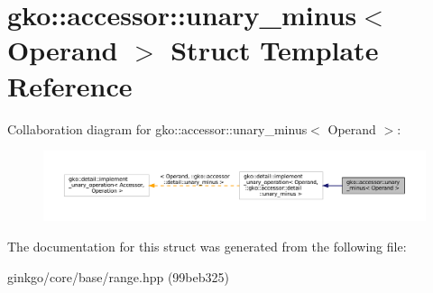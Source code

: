 \hypertarget{structgko_1_1accessor_1_1unary__minus}{}\section{gko\+:\+:accessor\+:\+:unary\+\_\+minus$<$ Operand $>$ Struct Template Reference}
\label{structgko_1_1accessor_1_1unary__minus}


Collaboration diagram for gko\+:\+:accessor\+:\+:unary\+\_\+minus$<$ Operand $>$\+:
\nopagebreak
\begin{figure}[H]
\begin{center}
\leavevmode
\includegraphics[width=350pt]{structgko_1_1accessor_1_1unary__minus__coll__graph}
\end{center}
\end{figure}


The documentation for this struct was generated from the following file\+:\begin{DoxyCompactItemize}
\item 
ginkgo/core/base/range.\+hpp (99beb325)\end{DoxyCompactItemize}
